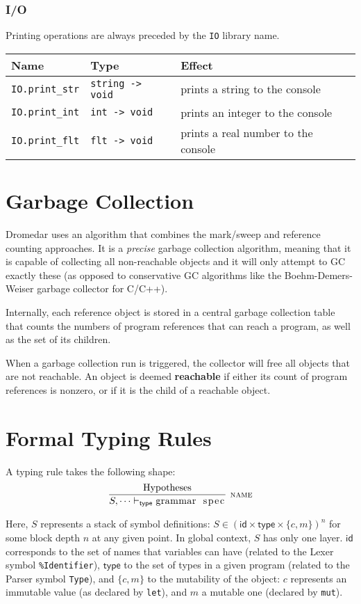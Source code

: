 \documentclass{article}
\newcommand{\code}[1]{\lstinline[columns=fixed]{#1}}
\newcommand{\drmrule}[5]{\frac{#1}{#2\vdash_{\mathsf{#3}}#4}\textsc{\ \small{#5}}}
\newcommand{\mc}[1]{\textnormal{\code{#1}}}
\begin{document}
			\subsubsection{I/O}
			
				Printing operations are always preceded by the \code{IO} library name.
			
				\begin{longtable}{l|l|l}
					\textbf{Name} & \textbf{Type} & \textbf{Effect} \\
					\midrule
					\code{IO.print_str} & \code{string -> void} & prints a string to the console\\
					\code{IO.print_int} & \code{int -> void} & prints an integer to the console\\
					\code{IO.print_flt} & \code{flt -> void} & prints a real number to the console
				\end{longtable}
		
	\section{Garbage Collection}
	
		Dromedar uses an algorithm that combines the mark/sweep and reference counting approaches. It is a \textit{precise} garbage collection algorithm, meaning that it is capable of collecting all non-reachable objects and it will only attempt to GC exactly these (as opposed to conservative GC algorithms like the Boehm-Demers-Weiser garbage collector for C/C++).
		
		Internally, each reference object is stored in a central garbage collection table that counts the numbers of program references that can reach a program, as well as the set of its children.
		
		When a garbage collection run is triggered, the collector will free all objects that are not reachable. An object is deemed \textbf{reachable} if either its count of program references is nonzero, or if it is the child of a reachable object.
		
	\section{Formal Typing Rules}
	
		A typing rule takes the following shape: $$ \drmrule{\mathrm{Hypotheses}}{S,\dots}{type}{\mc{grammar spec}}{name} $$
		
		Here, $S$ represents a stack of symbol definitions: $S \in (\mathsf{id} \times \mathsf{type} \times \{c,m\})^n$ for some block depth $n$ at any given point. In global context, $S$ has only one layer. $\mathsf{id}$ corresponds to the set of names that variables can have (related to the Lexer symbol \texttt{\%Identifier}), $\mathsf{type}$ to the set of types in a given program (related to the Parser symbol \texttt{Type}), and $\{c,m\}$ to the mutability of the object: $c$ represents an immutable value (as declared by \code{let}), and $m$ a mutable one (declared by \code{mut}).
		
\end{document}
